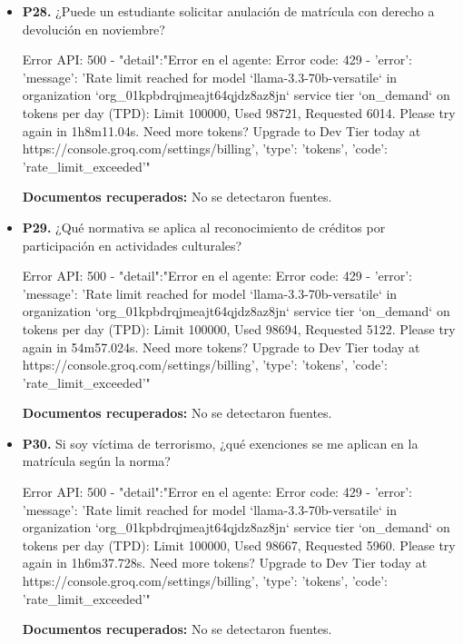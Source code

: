 \documentclass{article}
\begin{document}
\begin{itemize}
  \item \textbf{P28.} ¿Puede un estudiante solicitar anulación de matrícula con derecho a devolución en noviembre? \\
    \begin{respuesta_agente}
      Error API: 500 - {"detail":"Error en el agente: Error code: 429 - {'error': {'message': 'Rate limit reached for model `llama-3.3-70b-versatile` in organization `org_01kpbdrqjmeajt64qjdz8az8jn` service tier `on_demand` on tokens per day (TPD): Limit 100000, Used 98721, Requested 6014. Please try again in 1h8m11.04s. Need more tokens? Upgrade to Dev Tier today at https://console.groq.com/settings/billing', 'type': 'tokens', 'code': 'rate_limit_exceeded'}}"}
    \end{respuesta_agente}
    \vspace{0.2cm}
    \noindent\textbf{Documentos recuperados:} No se detectaron fuentes.

  \item \textbf{P29.} ¿Qué normativa se aplica al reconocimiento de créditos por participación en actividades culturales? \\
    \begin{respuesta_agente}
      Error API: 500 - {"detail":"Error en el agente: Error code: 429 - {'error': {'message': 'Rate limit reached for model `llama-3.3-70b-versatile` in organization `org_01kpbdrqjmeajt64qjdz8az8jn` service tier `on_demand` on tokens per day (TPD): Limit 100000, Used 98694, Requested 5122. Please try again in 54m57.024s. Need more tokens? Upgrade to Dev Tier today at https://console.groq.com/settings/billing', 'type': 'tokens', 'code': 'rate_limit_exceeded'}}"}
    \end{respuesta_agente}
    \vspace{0.2cm}
    \noindent\textbf{Documentos recuperados:} No se detectaron fuentes.

  \item \textbf{P30.} Si soy víctima de terrorismo, ¿qué exenciones se me aplican en la matrícula según la norma? \\
    \begin{respuesta_agente}
      Error API: 500 - {"detail":"Error en el agente: Error code: 429 - {'error': {'message': 'Rate limit reached for model `llama-3.3-70b-versatile` in organization `org_01kpbdrqjmeajt64qjdz8az8jn` service tier `on_demand` on tokens per day (TPD): Limit 100000, Used 98667, Requested 5960. Please try again in 1h6m37.728s. Need more tokens? Upgrade to Dev Tier today at https://console.groq.com/settings/billing', 'type': 'tokens', 'code': 'rate_limit_exceeded'}}"}
    \end{respuesta_agente}
    \vspace{0.2cm}
    \noindent\textbf{Documentos recuperados:} No se detectaron fuentes.


\end{itemize}
\end{document}

